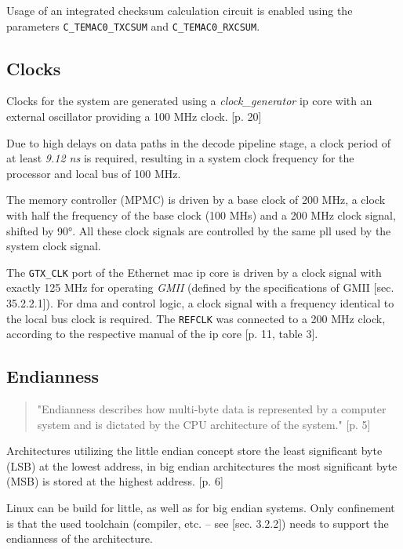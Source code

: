 Usage of an integrated checksum calculation circuit is enabled using the parameters \texttt{C\_TEMAC0\_TXCSUM} and \texttt{C\_TEMAC0\_RXCSUM}.

\subsection{Clocks}
\label{sec:clocks}

Clocks for the system are generated using a \textit{clock\_generator} \gls{ip} core with an external oscillator providing a 100 MHz clock. \cite{ug347}[p. 20]

Due to high delays on data paths in the decode pipeline stage, a clock period of at least \textit{9.12 ns} is required, resulting in a system clock frequency for the processor and local bus of 100 MHz.

The memory controller (MPMC) is driven by a base clock of 200 MHz, a clock with half the frequency of the base clock (100 MHs) and a 200 MHz clock signal, shifted by 90°. All these clock signals are controlled by the same \gls{pll} used by the system clock signal.

The \texttt{GTX\_CLK} port of the Ethernet \gls{mac} \gls{ip} core is driven by a clock signal with exactly 125 MHz for operating \textit{GMII} (defined by the specifications of GMII \cite{ieee802_3}[sec. 35.2.2.1]). For \gls{dma} and control logic, a clock signal with a frequency identical to the local bus clock is required. The \texttt{REFCLK} was connected to a 200 MHz clock, according to the respective manual of the \gls{ip} core \cite{xps_ll_temac}[p. 11, table 3].

\subsection{Endianness}

\begin{quote}
 "Endianness describes how multi-byte data is represented by a computer system and is dictated by the CPU architecture of the system." \cite{intel_endiannness}[p. 5]
\end{quote}

Architectures utilizing the little endian concept store the least significant byte (LSB) at the lowest address, in big endian architectures the most significant byte (MSB) is stored at the highest address. \cite{intel_endiannness}[p. 6]

Linux can be build for little, as well as for big endian systems. Only confinement is that the used toolchain (compiler, etc. -- see \cite{projectseminar}[sec. 3.2.2]) needs to support the endianness of the architecture.

